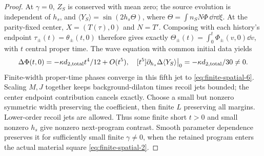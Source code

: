 \documentclass[12pt,a4paper]{article}
\begin{document}
\begin{proof}
At $\gamma=0$, $Z_S$ is conserved with mean zero; the source evolution
is independent of $h_s$, and $\langle Y_S\rangle=\sin(2h_s\Theta)$,
where $\Theta=\int n_SN\Phi\,\dd\tau\dd\xi$.
At the parity-fixed center, $X=(T(\tau),0)$ and $N=T'$.
Composing with each history's endpoint $\tau_\pm(t)=\theta_\pm(t,0)$
therefore gives exactly $\Theta_\pm(t)=\int_0^t\Phi_\pm(v,0)\dd v$,
with $t$ central proper time. The wave equation with common initial
data yields
\begin{equation}
 \Delta\Phi(t,0)=-\kappa d_{2,\rm total}t^4/12+O(t^5),
 \quad [t^5]\partial_{h_s}\Delta\langle Y_S\rangle\big|_0
       =-\kappa d_{2,\rm total}/30\ne0.                     \label{eq:finite-spatial-6}
\end{equation}
Finite-width proper-time phases converge in this fifth jet to \eqref{eq:finite-spatial-6}.
Scaling $M,J$ together keeps background-dilaton times recoil jets
bounded; the center endpoint contribution cancels exactly. Choose a
small but nonzero symmetric width preserving the coefficient, then
finite $L$ preserving all margins. Lower-order recoil jets are allowed.
Thus some finite short $t>0$ and small nonzero $h_s$ give nonzero
next-program contrast. Smooth parameter dependence preserves it for
sufficiently small finite $\gamma\ne0$, when the retained program
enters the actual material square \eqref{eq:finite-spatial-2}.


\end{proof}
\end{document}
